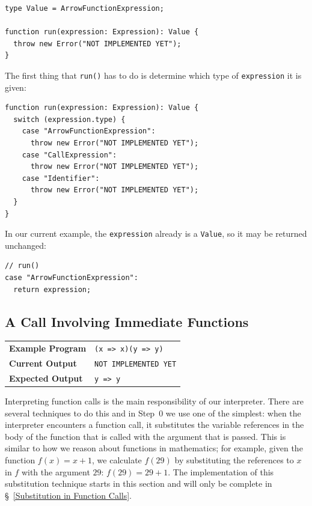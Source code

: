 \documentclass[12pt, oneside]{book}
\begin{document}
\begin{verbatim}
type Value = ArrowFunctionExpression;

function run(expression: Expression): Value {
  throw new Error("NOT IMPLEMENTED YET");
}
\end{verbatim}

The first thing that \texttt{run()} has to do is determine which type of \texttt{expression} it is given:

\begin{verbatim}
function run(expression: Expression): Value {
  switch (expression.type) {
    case "ArrowFunctionExpression":
      throw new Error("NOT IMPLEMENTED YET");
    case "CallExpression":
      throw new Error("NOT IMPLEMENTED YET");
    case "Identifier":
      throw new Error("NOT IMPLEMENTED YET");
  }
}
\end{verbatim}

In our current example, the \texttt{expression} already is a \texttt{Value}, so it may be returned unchanged:

\begin{verbatim}
// run()
case "ArrowFunctionExpression":
  return expression;
\end{verbatim}

\subsection{A Call Involving Immediate Functions}
\label{A Call Involving Immediate Functions}

\begin{center}
\begin{tabular}{ll}
\textbf{Example Program} & \texttt{(x => x)(y => y)} \\
\textbf{Current Output} & \texttt{NOT IMPLEMENTED YET} \\
\textbf{Expected Output} & \texttt{y => y} \\
\end{tabular}
\end{center}

Interpreting function calls is the main responsibility of our interpreter. There are several techniques to do this and in Step~0 we use one of the simplest: when the interpreter encounters a function call, it substitutes the variable references in the body of the function that is called with the argument that is passed. This is similar to how we reason about functions in mathematics; for example, given the function $f(x) = x + 1$, we calculate $f(29)$ by substituting the references to $x$ in $f$ with the argument $29$: $f(29) = 29 + 1$. The implementation of this substitution technique starts in this section and will only be complete in §~\ref{Substitution in Function Calls}.
\end{document}
